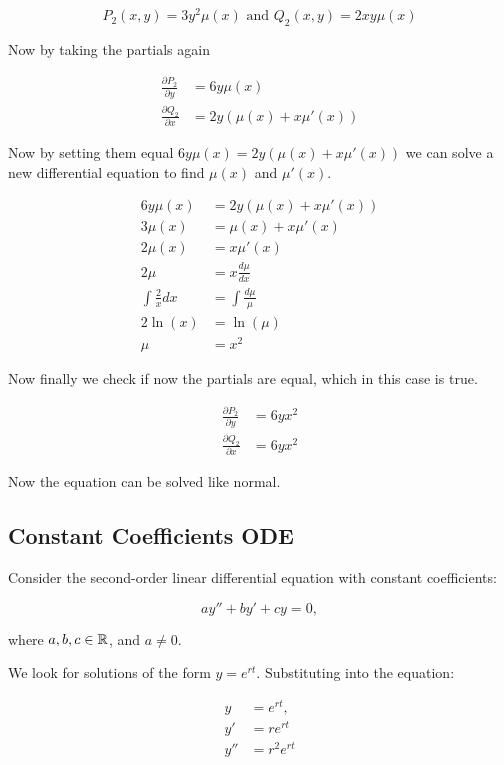 \[
    P_2 (x,y) = 3y^2 \mu(x) \text{ and } Q_2 (x,y)  = 2xy\mu(x)
\]

Now by taking the partials again

\begin{align*}
    \frac{\partial P_2}{\partial y} &= 6y\mu(x)\\  
    \frac{\partial Q_2}{\partial x} &= 2y(\mu(x) + x\mu'(x))  
\end{align*}

Now by setting them equal \(6y\mu(x) = 2y(\mu(x) + x\mu'(x))\) we can solve a new differential equation 
to find \(\mu(x)\) and \(\mu'(x)\).  

\begin{align*}
    6y\mu(x) &= 2y(\mu(x) + x\mu'(x)) \\
    3\mu(x) &= \mu(x) + x\mu'(x) \\
    2\mu(x) &= x\mu'(x)\\
    2\mu &= x \frac{d\mu}{dx} \\
    \int \frac{2}{x}dx &= \int \frac{d\mu}{\mu} \\
    2\ln(x) &= \ln(\mu) \\
    \mu &= x^2
\end{align*}

Now finally we check if now the partials are equal, which in this case is true.

\begin{align*}
    \frac{\partial P_2}{\partial y} &= 6yx^2\\  
    \frac{\partial Q_2}{\partial x} &= 6yx^2  
\end{align*}

Now the equation can be solved like normal.

\subsection{Constant Coefficients ODE}

Consider the second-order linear differential equation with constant coefficients:

\[
    a y'' + b y' + c y = 0,
\]

where \( a, b, c \in \mathbb{R} \), and \( a \neq 0 \).

We look for solutions of the form \( y = e^{rt} \). Substituting into the equation:

\begin{align*}
    y &= e^{rt}, \\
    y' &= r e^{rt} \\
    y'' &=  r^2 e^{rt}
\end{align*}

